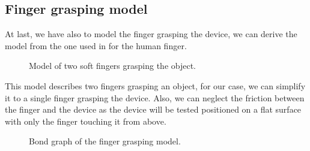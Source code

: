 \subsection{Finger grasping model}
At last, we have also to model the finger grasping the device, we can derive the model from the one used in \cite{Finger_grasping_model} for the human finger.

\begin{figure}
    \centering
    \caption{Model of two soft fingers grasping the object.}
    \label{fig:Finger grasping model}
\end{figure}

This model describes two fingers grasping an object, for our case, we can simplify it to a single finger grasping the device.
Also, we can neglect the friction between the finger and the device as the device will be tested positioned on a flat surface with only the finger touching it from above.
\begin{figure}
    \centering
    \resizebox{.9\linewidth}{!}{
        
    }
    \caption{Bond graph of the finger grasping model.}
    \label{fig:Finger grasping bond graph}
\end{figure}
